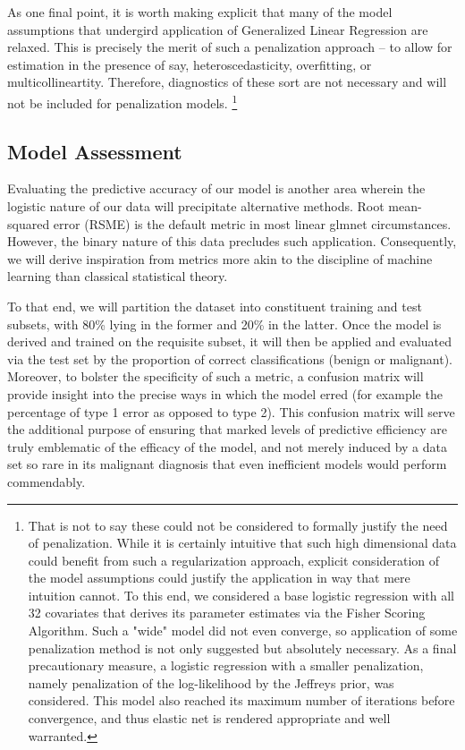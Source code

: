 \documentclass[10pt]{article}
\begin{document}
	As one final point, it is worth making explicit that many of the model assumptions that undergird application of  Generalized Linear Regression are relaxed.  This is precisely the merit of such a penalization approach -- to allow for estimation in the presence of say, heteroscedasticity, overfitting, or multicollineartity.  Therefore, diagnostics of these sort are not necessary and will not be included for penalization models.  \footnote {That is not to say these could not be considered to formally justify the need of penalization.  While it is certainly intuitive that such high dimensional data could benefit from such a regularization approach, explicit consideration of the model assumptions could justify the application in way that mere intuition cannot.  To this end, we considered a base logistic regression with all 32 covariates that derives its parameter estimates via the Fisher Scoring Algorithm.  Such a "wide" model did not even converge, so application of some penalization method is not only suggested but absolutely necessary.  As a final precautionary measure, a logistic regression with a smaller penalization, namely penalization of the log-likelihood by the Jeffreys prior, was considered.  This model also reached its maximum number of iterations before convergence, and thus elastic net is rendered appropriate and well warranted.}

\subsection{Model Assessment}

	Evaluating the predictive accuracy of our model is another area wherein the logistic nature of our data will precipitate alternative methods.  Root mean-squared error (RSME) is the default metric in most linear glmnet circumstances.  However, the binary nature of this data precludes such application.  Consequently, we will derive inspiration from metrics more akin to the discipline of machine learning than classical statistical theory.  
	
	To that end, we will partition the dataset into constituent training and test subsets, with 80\% lying in the former and 20\% in the latter.  Once the model is derived and trained on the requisite subset, it will then be applied and evaluated via the test set by the proportion of correct classifications (benign or malignant).  Moreover, to bolster the specificity of such a metric, a confusion matrix will provide insight into the precise ways in which the model erred (for example the percentage of type 1 error as opposed to type 2).  This confusion matrix will serve the additional purpose of ensuring that marked levels of predictive efficiency are truly emblematic of the efficacy of the model, and not merely induced by a data set so rare in its malignant diagnosis that even inefficient models would perform commendably.  
\end{document}
